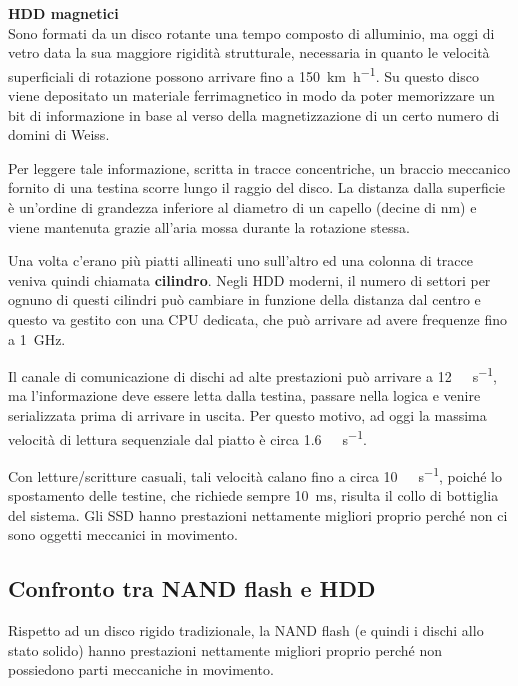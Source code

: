 \documentclass[11pt,4paper]{report}
\begin{document}
\begin{tcolorbox}[breakable]
\textbf{HDD magnetici}\\
Sono formati da un disco rotante una tempo composto di alluminio, ma oggi di vetro data la sua maggiore rigidità strutturale, necessaria in quanto le velocità superficiali di rotazione possono arrivare fino a \SI{150}{\kilo\meter\per\hour}. Su questo disco viene depositato un materiale ferrimagnetico in modo da poter memorizzare un bit di informazione in base al verso della magnetizzazione di un certo numero di domini di Weiss.

Per leggere tale informazione, scritta in tracce concentriche, un braccio meccanico fornito di una testina scorre lungo il raggio del disco. La distanza dalla superficie è un'ordine di grandezza inferiore al diametro di un capello (decine di \si{\nano\meter}) e viene mantenuta grazie all'aria mossa durante la rotazione stessa.

Una volta c'erano più piatti allineati uno sull'altro ed una colonna di tracce veniva quindi chiamata \textbf{cilindro}. Negli HDD moderni, il numero di settori per ognuno di questi cilindri può cambiare in funzione della distanza dal centro e questo va gestito con una CPU dedicata, che può arrivare ad avere frequenze fino a \SI{1}{\giga\hertz}.

Il canale di comunicazione di dischi ad alte prestazioni può arrivare a \SI{12}{\giga\bit\per\second}, ma l'informazione deve essere letta dalla testina, passare nella logica e venire serializzata prima di arrivare in uscita. Per questo motivo, ad oggi la massima velocità di lettura sequenziale dal piatto è circa \SI{1.6}{\giga\bit\per\second}.

Con letture/scritture casuali, tali velocità calano fino a circa \SI{10}{\mega\byte\per\second}, poiché lo spostamento delle testine, che richiede sempre \SI{10}{\milli\second}, risulta il collo di bottiglia del sistema.
Gli SSD hanno prestazioni nettamente migliori proprio perché non ci sono oggetti meccanici in movimento.
\end{tcolorbox}

\subsection{Confronto tra NAND flash e HDD}
Rispetto ad un disco rigido tradizionale, la NAND flash (e quindi i dischi allo stato solido) hanno prestazioni nettamente migliori proprio perché non possiedono parti meccaniche in movimento.
\end{document}

